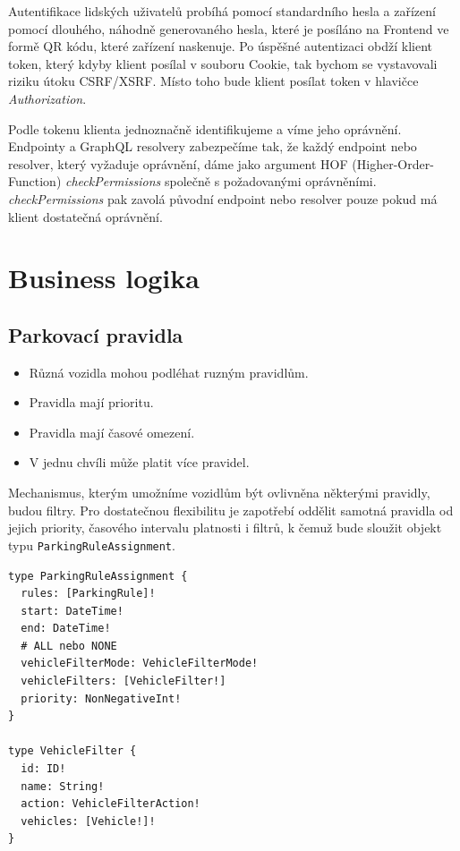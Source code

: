 Autentifikace lidských uživatelů probíhá pomocí standardního hesla a zařízení pomocí dlouhého, náhodně generovaného hesla,
které je posíláno na Frontend ve formě QR kódu, které zařízení naskenuje.
Po úspěšné autentizaci obdží klient token, který kdyby klient posílal v souboru Cookie,
tak bychom se vystavovali riziku útoku CSRF/XSRF.
Místo toho bude klient posílat token v hlavičce \textit{Authorization}.

Podle tokenu klienta jednoznačně identifikujeme a víme jeho oprávnění. Endpointy a GraphQL resolvery zabezpečíme tak,
že každý endpoint nebo resolver, který vyžaduje oprávnění, dáme jako argument HOF (Higher-Order-Function)
\textit{checkPermissions} společně s požadovanými oprávněními. \textit{checkPermissions} pak zavolá původní endpoint
nebo resolver pouze pokud má klient dostatečná oprávnění.

\section{Business logika}

\subsection{Parkovací pravidla} \label{analysis_parking_schema}

\begin{itemize}
  \item Různá vozidla mohou podléhat ruzným pravidlům.
  \item Pravidla mají prioritu.
  \item Pravidla mají časové omezení.
  \item V jednu chvíli může platit více pravidel.
\end{itemize}

Mechanismus, kterým umožníme vozidlům být ovlivněna některými pravidly,
budou filtry.
Pro dostatečnou flexibilitu je zapotřebí oddělit samotná pravidla od jejich
priority, časového intervalu platnosti i filtrů,
k čemuž bude sloužit objekt typu \texttt{ParkingRuleAssignment}.

\begin{lstlisting}
type ParkingRuleAssignment {
  rules: [ParkingRule]!
  start: DateTime!
  end: DateTime!
  # ALL nebo NONE
  vehicleFilterMode: VehicleFilterMode!
  vehicleFilters: [VehicleFilter!]
  priority: NonNegativeInt!
}

type VehicleFilter {
  id: ID!
  name: String!
  action: VehicleFilterAction!
  vehicles: [Vehicle!]!
}
\end{lstlisting}

